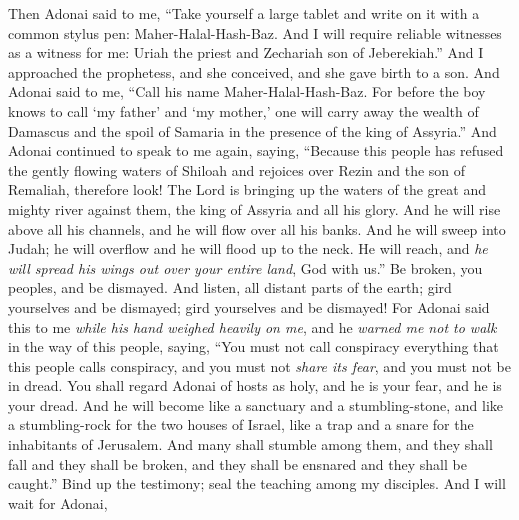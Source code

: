 \begin{biblechapter} %
 Then Adonai said to me, “Take yourself a large tablet and write on it with a common stylus pen: Maher-Halal-Hash-Baz.
\verse And I will require reliable witnesses as a witness for me: Uriah the priest and Zechariah son of Jeberekiah.”
\verse And I approached the prophetess, and she conceived, and she gave birth to a son. And Adonai said to me, “Call his name Maher-Halal-Hash-Baz.
\verse For before the boy knows to call ‘my father’ and ‘my mother,’ one will carry away the wealth of Damascus and the spoil of Samaria in the presence of the king of Assyria.”
 And Adonai continued to speak to me again, saying,
\verse “Because this people has refused the gently flowing waters of Shiloah and rejoices over Rezin and the son of Remaliah,
\verse therefore look! The Lord is bringing up the waters of the great and mighty river against them, the king of Assyria and all his glory.
\verse And he will rise above all his channels, 
and he will flow over all his banks.
\verse And he will sweep into Judah; 
he will overflow and he will flood up to the neck. 
He will reach, and \textit{he will spread his wings out over your entire land}, God with us.”
\verse Be broken, you peoples, and be dismayed. 
And listen, all distant parts of the earth; 
gird yourselves and be dismayed; 
gird yourselves and be dismayed!
 For Adonai said this to me \textit{while his hand weighed heavily on me}, 
and he \textit{warned me not to walk} in the way of this people, saying,
\verse “You must not call conspiracy everything that this people calls conspiracy, 
and you must not \textit{share its fear}, and you must not be in dread.
\verse You shall regard Adonai of hosts as holy, 
and he is your fear, and he is your dread.
\verse And he will become like a sanctuary and a stumbling-stone, 
and like a stumbling-rock for the two houses of Israel, 
like a trap and a snare for the inhabitants of Jerusalem.
\verse And many shall stumble among them, 
and they shall fall and they shall be broken, 
and they shall be ensnared and they shall be caught.”
\verse Bind up the testimony; 
seal the teaching among my disciples.
\verse And I will wait for Adonai, 

\end{biblechapter}
